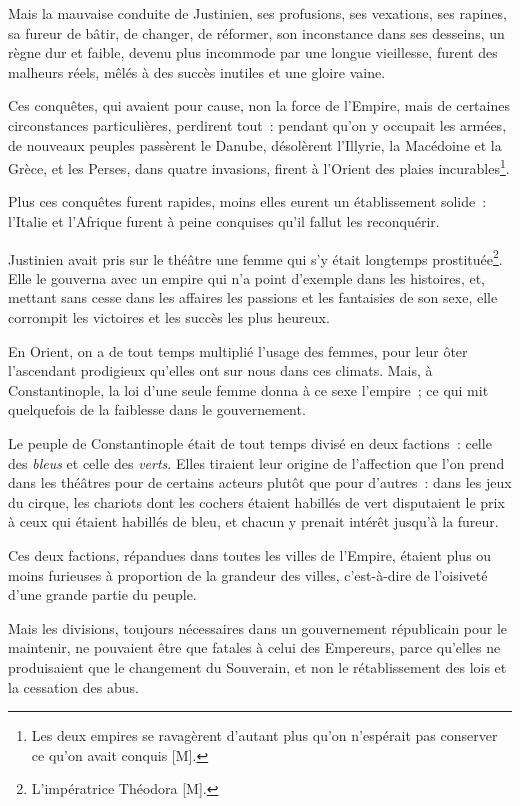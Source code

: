 \documentclass[french,twoside]{book} %
\begin{document}
Mais la mauvaise conduite de Justinien, ses profusions, ses vexations, ses rapines, sa fureur de bâtir, de changer, de réformer, son inconstance dans ses desseins, un règne dur et faible, devenu plus incommode par une longue vieillesse, furent des malheurs réels, mêlés à des succès inutiles et une gloire vaine.\par
Ces conquêtes, qui avaient pour cause, non la force de l’Empire, mais de certaines circonstances particulières, perdirent tout : pendant qu’on y occupait les armées, de nouveaux peuples passèrent le Danube, désolèrent l’Illyrie, la Macédoine et la Grèce, et les Perses, dans quatre invasions, firent à l’Orient des plaies incurables\footnote{Les deux empires se ravagèrent d’autant plus qu’on n’espérait pas conserver ce qu’on avait conquis [M].}.\par
Plus ces conquêtes furent rapides, moins elles eurent un établissement solide : l’Italie et l’Afrique furent à peine conquises qu’il fallut les reconquérir.\par
Justinien avait pris sur le théâtre une femme qui s’y était longtemps prostituée\footnote{L’impératrice Théodora [M].}. Elle le gouverna avec un empire qui n’a point d’exemple dans les histoires, et, mettant sans cesse dans les affaires les passions et les fantaisies de son sexe, elle corrompit les victoires et les succès les plus heureux.\par
En Orient, on a de tout temps multiplié l’usage des femmes, pour leur ôter l’ascendant prodigieux qu’elles ont sur nous dans ces climats. Mais, à Constantinople, la loi d’une seule femme donna à ce sexe l’empire ; ce qui mit quelquefois de la faiblesse dans le gouvernement.\par
Le peuple de Constantinople était de tout temps divisé en deux factions : celle des {\itshape bleus} et celle des {\itshape verts}. Elles tiraient leur origine de l’affection que l’on prend dans les théâtres pour de certains acteurs plutôt que pour d’autres : dans les jeux du cirque, les chariots dont les cochers étaient habillés de vert disputaient le prix à ceux qui étaient habillés de bleu, et chacun y prenait intérêt jusqu’à la fureur.\par
Ces deux factions, répandues dans toutes les villes de l’Empire, étaient plus ou moins furieuses à proportion de la grandeur des villes, c’est-à-dire de l’oisiveté d’une grande partie du peuple.\par
Mais les divisions, toujours nécessaires dans un gouvernement républicain pour le maintenir, ne pouvaient être que fatales à celui des Empereurs, parce qu’elles ne produisaient que le changement du Souverain, et non le rétablissement des lois et la cessation des abus.\par
\end{document}
